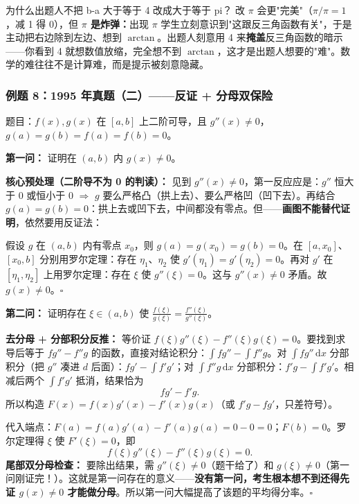 \documentclass[a4paper]{article}
\begin{document}
\begin{knowledgebox}{为什么出题人不把 b-a 大于等于 4 改成大于等于 pi？}
改 $\pi$ 会更"完美"（$\pi/\pi=1$，减 1 得 0），但 \textbf{$\pi$ 是炸弹：}出现 $\pi$ 学生立刻意识到"这跟反三角函数有关"，于是主动把右边除到左边、想到 $\arctan$。出题人刻意用 4 来\textbf{掩盖}反三角函数的暗示——你看到 4 就想数值放缩，完全想不到 $\arctan$，这才是出题人想要的"难"。数学的难往往不是计算难，而是提示被刻意隐藏。
\end{knowledgebox}

\subsubsection{例题 8：1995 年真题（二）——反证 + 分母双保险}

题目：$f(x),g(x)$ 在 $[a,b]$ 上二阶可导，且 $g''(x)\neq 0$，$g(a)=g(b)=f(a)=f(b)=0$。

\textbf{第一问：} 证明在 $(a,b)$ 内 $g(x)\neq 0$。

\textbf{核心预处理（二阶导不为 0 的判读）：} 见到 $g''(x)\neq0$，第一反应应是：$g''$ 恒大于 0 或恒小于 0 $\Rightarrow$ $g$ 要么严格凸（拱上去）、要么严格凹（凹下去）。再结合 $g(a)=g(b)=0$：拱上去或凹下去，中间都没有零点。但——\textbf{画图不能替代证明}，依然要用反证法：

假设 $g$ 在 $(a,b)$ 内有零点 $x_0$，则 $g(a)=g(x_0)=g(b)=0$。在 $[a,x_0]$、$[x_0,b]$ 分别用罗尔定理：存在 $\eta_1$、$\eta_2$ 使 $g'(\eta_1)=g'(\eta_2)=0$。再对 $g'$ 在 $[\eta_1,\eta_2]$ 上用罗尔定理：存在 $\xi$ 使 $g''(\xi)=0$。这与 $g''(x)\neq0$ 矛盾。故 $g(x)\neq0$。$\square$

\textbf{第二问：} 证明存在 $\xi\in(a,b)$ 使 $\frac{f(\xi)}{g(\xi)}=\frac{f''(\xi)}{g''(\xi)}$。

\textbf{去分母 + 分部积分反推：} 等价证 $f(\xi)g''(\xi)-f''(\xi)g(\xi)=0$。要找到求导后等于 $f g''-f''g$ 的函数，直接对结论积分：$\int f g''-\int f'' g$。对 $\int f g''\,\mathrm{d}x$ 分部积分（把 $g''$ 凑进 $d$ 后面）：$fg'-\int f'g'$；对 $\int f''g\,\mathrm{d}x$ 分部积分：$f'g-\int f'g'$。相减后两个 $\int f'g'$ 抵消，结果恰为
\[
fg'-f'g .
\]
所以构造 $F(x)=f(x)g'(x)-f'(x)g(x)$（或 $f'g-fg'$，只差符号）。

代入端点：$F(a)=f(a)g'(a)-f'(a)g(a)=0-0=0$；$F(b)=0$。罗尔定理得 $\xi$ 使 $F'(\xi)=0$，即
\[
f(\xi)g''(\xi)-f''(\xi)g(\xi)=0 .
\]
\textbf{尾部双分母检查：} 要除出结果，需 $g''(\xi)\neq0$（题干给了）和 $g(\xi)\neq0$（第一问刚证完！）。这就是第一问存在的意义——\textbf{没有第一问，考生根本想不到还得先证 $g(x)\neq0$ 才能做分母}。所以第一问大幅提高了该题的平均得分率。$\square$
\end{document}

